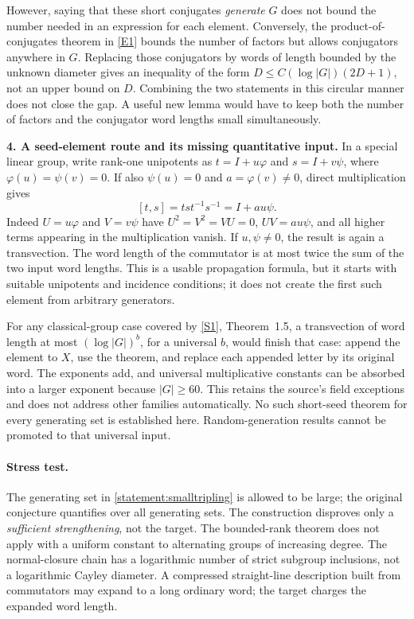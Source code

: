 \documentclass[11pt,a4paper]{article}
\newcommand{\sref}[2]{\hyperlink{source:#1:#2}{[S#2]}}
\newcommand{\eref}[2]{\hyperlink{extra:#1:#2}{[E#2]}}
\numberwithin{equation}{section}
\begin{document}
However, saying that these short conjugates \emph{generate} $G$ does
not bound the number needed in an expression for each element.
Conversely, the product-of-conjugates theorem in \eref{statement}{1} bounds
the number of factors but allows conjugators anywhere in $G$.
Replacing those conjugators by words of length bounded by the unknown
diameter gives an inequality of the form
$D\le C(\log|G|)(2D+1)$, not an upper bound on $D$.
Combining the two statements in this circular manner does not close the
gap. A useful new lemma would have to keep both the number of factors
and the conjugator word lengths small simultaneously.

\textbf{4. A seed-element route and its missing quantitative input.}
In a special linear group, write rank-one unipotents as
$t=I+u\varphi$ and $s=I+v\psi$, where
$\varphi(u)=\psi(v)=0$. If also $\psi(u)=0$ and
$a=\varphi(v)\ne0$, direct multiplication gives
\begin{equation}\label{statement:commutator}
 [t,s]=tst^{-1}s^{-1}=I+a u\psi.
\end{equation}
Indeed $U=u\varphi$ and $V=v\psi$ have $U^2=V^2=VU=0$,
$UV=a u\psi$, and all higher terms appearing in the multiplication
vanish. If $u,\psi\ne0$, the result is again a transvection.
The word length of the commutator is at most twice the sum of the two
input word lengths. This is a usable propagation formula, but it starts
with suitable unipotents and incidence conditions; it does not create
the first such element from arbitrary generators.

For any classical-group case covered by \sref{statement}{1}, Theorem~1.5,
a transvection of word length at most $(\log|G|)^b$, for a universal
$b$, would finish that case: append the element to $X$, use the theorem,
and replace each appended letter by its original word. The exponents
add, and universal multiplicative constants can be absorbed into a
larger exponent because $|G|\ge60$. This retains the source's field
exceptions and does not address other families automatically.
No such short-seed theorem for every generating set is established here.
Random-generation results cannot be promoted to that universal input.

\paragraph{Stress test.}
The generating set in \eqref{statement:smalltripling} is allowed to be large;
the original conjecture quantifies over all generating sets. The
construction disproves only a \emph{sufficient strengthening}, not the
target. The bounded-rank theorem does not apply with a uniform constant
to alternating groups of increasing degree. The normal-closure chain
has a logarithmic number of strict subgroup inclusions, not a logarithmic
Cayley diameter. A compressed straight-line description built from
commutators may expand to a long ordinary word; the target charges the
expanded word length.
\end{document}
